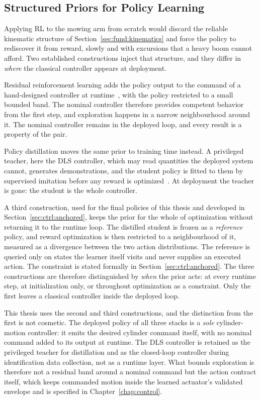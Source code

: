 \subsection{Structured Priors for Policy Learning}
\label{sec:fund:prior}

Applying RL to the mowing arm from scratch would discard the reliable
kinematic structure of Section~\ref{sec:fund:kinematics} and force the
policy to rediscover it from reward, slowly and with excursions that a
heavy boom cannot afford. Two established constructions inject that
structure, and they differ in \emph{where} the classical controller
appears at deployment.

Residual reinforcement learning adds the policy output to the command of a
hand-designed controller at
runtime~\cite{johannink2019residual,silver2018residual}, with the policy
restricted to a small bounded band. The nominal controller therefore provides
competent behavior from the first step, and exploration happens in a narrow
neighbourhood around it. The nominal controller remains in the deployed loop, and every
result is a property of the pair.

Policy distillation moves the same prior to training time instead. A
privileged teacher, here the DLS controller, which may read
quantities the deployed system cannot, generates demonstrations, and
the student policy is fitted to them by supervised imitation before any
reward is optimized~\cite{ross2011reduction}. At deployment the teacher
is gone: the student is the whole controller.

A third construction, used for the final policies of this thesis and
developed in Section~\ref{sec:ctrl:anchored}, keeps the prior for the
whole of optimization without returning it to the runtime loop. The
distilled student is frozen as a \emph{reference} policy, and reward
optimization is then restricted to a neighbourhood of it, measured as a
divergence between the two action distributions. The reference is queried only
on states the learner itself visits and never supplies an executed action. The
constraint is stated formally in Section~\ref{sec:ctrl:anchored}.
The three constructions are therefore distinguished by \emph{when} the prior
acts: at every runtime step, at initialization only, or throughout
optimization as a constraint. Only the first leaves a classical
controller inside the deployed loop.

This thesis uses the second and third constructions, and the distinction
from the first is not cosmetic. The deployed policy of all three stacks is a \emph{sole}
cylinder-motion controller: it emits the desired cylinder command
itself, with no nominal command added to its output at runtime. The DLS
controller is retained as the privileged teacher for distillation and as
the closed-loop controller during identification data collection, not as
a runtime layer. What bounds exploration is therefore not a residual band around a nominal
command but the action contract itself, which keeps commanded motion
inside the learned actuator's validated envelope and is specified in
Chapter~\ref{chap:control}.

